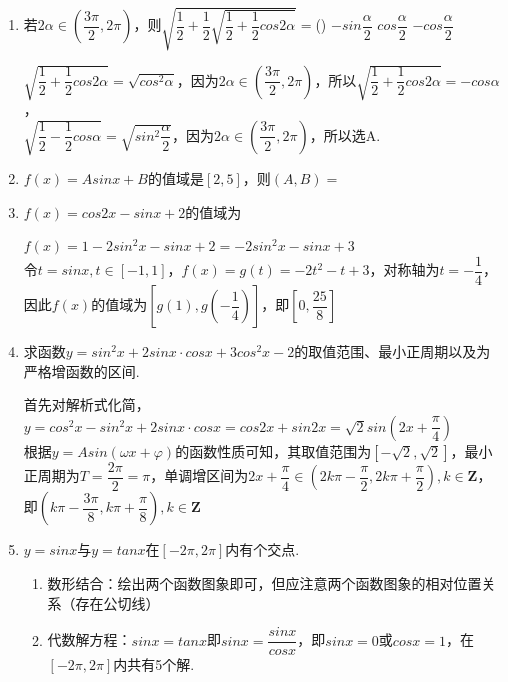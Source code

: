 \begin{enumerate}
\begin{jieda}
\begin{enumerate}
            \end{enumerate}
        \end{jieda}
        \item 若$2\alpha \in (\dfrac{3\pi}{2}, 2\pi)$，则$\sqrt{\dfrac{1}{2}+\dfrac{1}{2}\sqrt{\dfrac{1}{2}+\dfrac{1}{2}cos2\alpha}} = $\dotfill()
        {$-sin\dfrac{\alpha}{2}$}
        {$cos\dfrac{\alpha}{2}$}
        {$-cos\dfrac{\alpha}{2}$}
        \begin{jieda}
            $\sqrt{\dfrac{1}{2}+\dfrac{1}{2}cos2\alpha} = \sqrt{cos^2\alpha}$，因为$2\alpha \in (\dfrac{3\pi}{2}, 2\pi)$，所以$\sqrt{\dfrac{1}{2}+\dfrac{1}{2}cos2\alpha} = -cos\alpha$，\\
            $\sqrt{\dfrac{1}{2}-\dfrac{1}{2}cos\alpha} = \sqrt{sin^2\dfrac{\alpha}{2}}$，因为$2\alpha \in (\dfrac{3\pi}{2}, 2\pi)$，所以选A.
        \end{jieda}
        \item $f(x) = Asinx + B$的值域是$[2, 5]$，则$(A, B) = $
        \item $f(x) = cos2x - sinx + 2$的值域为
            \begin{jieda}
                $f(x) = 1-2sin^2x - sinx + 2 = -2sin^2x - sinx + 3$ \\
                令$t = sinx, t \in [-1, 1]$，$f(x) = g(t) = -2t^2 - t + 3$，对称轴为$t = -\dfrac{1}{4}$，因此$f(x)$的值域为$[g(1), g(-\dfrac{1}{4})]$，即$\left[0, \dfrac{25}{8}\right]$
            \end{jieda}
        \item 求函数$y = sin^2x + 2sinx \cdot cosx + 3cos^2x - 2$的取值范围、最小正周期以及为严格增函数的区间.
        \begin{jieda}
            首先对解析式化简，$y = cos^2x - sin^2x + 2sinx \cdot cosx = cos2x + sin2x = \sqrt{2}sin(2x+\dfrac{\pi}{4})$ \\
            根据$y = Asin(\omega x + \varphi)$的函数性质可知，其取值范围为$[-\sqrt{2}, \sqrt{2}]$，最小正周期为$T = \dfrac{2\pi}{2} = \pi$，单调增区间为$2x+\dfrac{\pi}{4} \in (2k\pi - \dfrac{\pi}{2}, 2k\pi + \dfrac{\pi}{2}), k \in \mathbf{Z}$，即$(k\pi - \dfrac{3\pi}{8}, k\pi + \dfrac{\pi}{8}),  k \in \mathbf{Z}$
        \end{jieda}
        \item $y = sinx$与$y = tanx$在$[-2\pi, 2\pi]$内有个交点.
        \begin{jieda}
            \begin{enumerate}
                \item 数形结合：绘出两个函数图象即可，但应注意两个函数图象的相对位置关系（存在公切线）
                \item 代数解方程：$sinx = tanx$即$sinx = \dfrac{sinx}{cosx}$，即$sinx = 0$或$cosx = 1$，在$[-2\pi, 2\pi]$内共有5个解.
            \end{enumerate}
        \end{jieda}
            

\end{enumerate}
